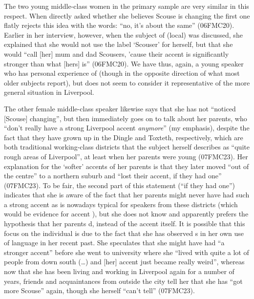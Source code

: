 The two young middle-class women in the primary sample are very similar in this respect.
When directly asked whether she believes Scouse is changing the first one flatly rejects this idea with the words: ``no, it's about the same'' (06FMC20).
Earlier in her interview, however, when the subject of (local)  was discussed, she explained that she would not use the label `Scouser' for herself, but that she would ``call [her] mum and dad Scousers, 'cause their accent is significantly stronger than what [hers] is'' (06FMC20).
We have thus, again, a young speaker who has personal experience of   (though in the opposite direction of what most older subjects report), but does not seem to consider it representative of the more general situation in Liverpool.

The other female middle-class speaker likewise says that she has not ``noticed [Scouse] changing'', but then immediately goes on to talk about her parents, who ``don't really have a strong Liverpool accent \emph{anymore}'' (my emphasis), despite the fact that they have grown up in the Dingle and Toxteth, respectively, which are both traditional working-class districts that the subject herself describes as ``quite rough areas of Liverpool'', at least when her parents were young (07FMC23).
Her explanation for the `softer' accents of her parents is that they later moved ``out of the centre'' to a northern suburb and ``lost their accent, if they had one'' (07FMC23).
To be fair, the second part of this statement (``if they had one'') indicates that she is aware of the fact that her parents might never have had such a strong accent as is nowadays typical for speakers from these districts (which would be evidence for accent ), but she does not know and apparently prefers the hypothesis that her parents d, instead of the accent itself.
It is possible that this focus on the individual is due to the fact that she has observed s in her own use of language in her recent past.
She speculates that she might have had ``a stronger accent'' before she went to university where she ``lived with quite a lot of people from down south (\ldots) and [her] accent just became really weird'', whereas now that she has been living and working in Liverpool again for a number of years, friends and acquaintances from outside the city tell her that she has ``got more Scouse'' again, though she herself ``can't tell'' (07FMC23).

